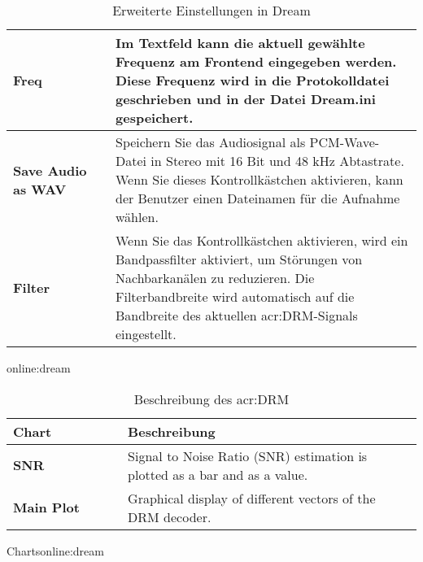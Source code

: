 \begin{table}[htb]
\begin{center}
\begin{tabular}{|p{0.25\linewidth} | p{0.75\linewidth}|}
			\midrule
			\textbf{Freq} & Im Textfeld kann die aktuell gewählte Frequenz am Frontend eingegeben werden. Diese Frequenz wird in die Protokolldatei geschrieben und in der Datei Dream.ini gespeichert.
			\\
			\midrule
			\textbf{Save Audio as WAV} & Speichern Sie das Audiosignal als PCM-Wave-Datei in Stereo mit 16 Bit und 48 kHz Abtastrate. Wenn Sie dieses Kontrollkästchen aktivieren, kann der Benutzer einen Dateinamen für die Aufnahme wählen. \\
			\midrule
			\textbf{Filter}& Wenn Sie das Kontrollkästchen aktivieren, wird ein Bandpassfilter aktiviert, um Störungen von Nachbarkanälen zu reduzieren. Die Filterbandbreite wird automatisch auf die Bandbreite des aktuellen \gls{acr:DRM}-Signals eingestellt.\\
			\bottomrule
		\end{tabular}
		\caption{Erweiterte Einstellungen in Dream}\gls{online:dream}
		\label{tab:advdream}
	\end{center}
\end{table}

\begin{table}[ht]
	\begin{center}
		\begin{tabular}{|p{0.28\linewidth} | p{0.72\linewidth}|}
			\toprule
			\textbf{Chart} & \textbf{Beschreibung} \\
			\midrule
			\textbf{SNR} & Signal to Noise Ratio (SNR) estimation is plotted as a bar and as a value.
			\\
			\midrule
			\textbf{Main Plot} & Graphical display of different vectors of the DRM decoder. \\
			\bottomrule
		\end{tabular}
		\caption{Beschreibung des \gls{acr:DRM}}Charts\gls{online:dream}
		\label{tab:drmchart}
	\end{center}
\end{table}